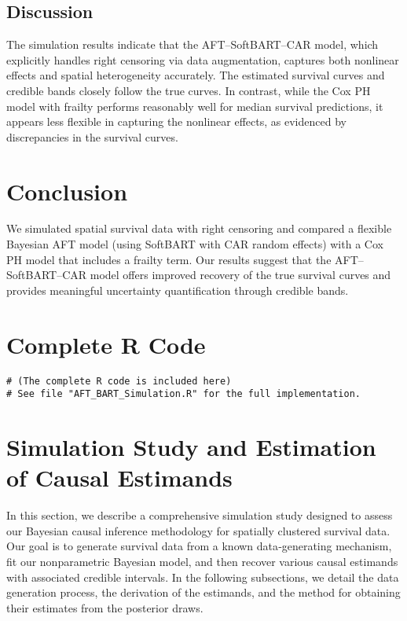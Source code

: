 \documentclass[useAMS,referee]{biom}
\begin{document}
\subsection{Discussion}
The simulation results indicate that the AFT--SoftBART--CAR model, which explicitly handles right censoring via data augmentation, captures both nonlinear effects and spatial heterogeneity accurately. The estimated survival curves and credible bands closely follow the true curves. In contrast, while the Cox PH model with frailty performs reasonably well for median survival predictions, it appears less flexible in capturing the nonlinear effects, as evidenced by discrepancies in the survival curves.

\section{Conclusion}
We simulated spatial survival data with right censoring and compared a flexible Bayesian AFT model (using SoftBART with CAR random effects) with a Cox PH model that includes a frailty term. Our results suggest that the AFT--SoftBART--CAR model offers improved recovery of the true survival curves and provides meaningful uncertainty quantification through credible bands.

\appendix
\section{Complete R Code}
\label{appendix:rcode}
\begin{verbatim}
# (The complete R code is included here)
# See file "AFT_BART_Simulation.R" for the full implementation.
\end{verbatim}









\section{Simulation Study and Estimation of Causal Estimands}

In this section, we describe a comprehensive simulation study designed to assess our Bayesian causal inference methodology for spatially clustered survival data. Our goal is to generate survival data from a known data‐generating mechanism, fit our nonparametric Bayesian model, and then recover various causal estimands with associated credible intervals. In the following subsections, we detail the data generation process, the derivation of the estimands, and the method for obtaining their estimates from the posterior draws.
\end{document}
